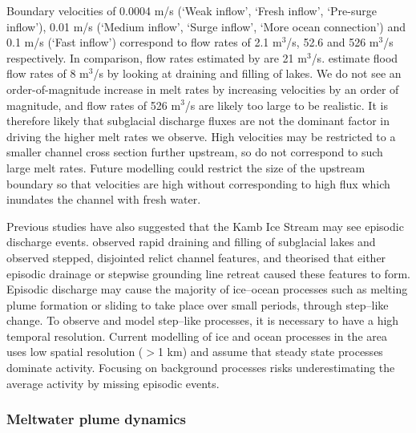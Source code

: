 Boundary velocities of 0.0004  $\mathrm{m}$/s (`Weak inflow', `Fresh inflow', `Pre-surge inflow'), 0.01  $\mathrm{m}$/s (`Medium inflow', `Surge inflow', `More ocean connection') and 0.1 $\mathrm{m}$/s (`Fast inflow') correspond to flow rates of 2.1 $\mathrm{m}^3$/s, 52.6 and 526 $\mathrm{m}^3$/s respectively. In comparison, flow rates estimated by \cite{le2009subglacial} are 21 $\mathrm{m}^3$/s. \cite{kim2016active} estimate flood flow rates of 8 $\mathrm{m}^3$/s by looking at draining and filling of lakes. We do not see an order-of-magnitude increase in melt rates by increasing velocities by an order of magnitude, and flow rates of 526 $\mathrm{m}^3$/s are likely too large to be realistic. It is therefore likely that subglacial discharge fluxes are not the dominant factor in driving the higher melt rates we observe. High velocities may be restricted to a smaller channel cross section further upstream, so do not correspond to such large melt rates. Future modelling could restrict the size of the upstream boundary so that velocities are high without corresponding to high flux which inundates the channel with fresh water.

Previous studies have also suggested that the Kamb Ice Stream may see episodic discharge events. \cite{kim2016active} observed rapid draining and filling of subglacial lakes and \cite{horgan2017poststagnation} observed stepped, disjointed relict channel features, and theorised that either episodic drainage or stepwise grounding line retreat caused these features to form.
Episodic discharge may cause the majority of ice--ocean processes such as melting plume formation or sliding to take place over small periods, through step--like change. To observe and model step--like processes, it is necessary to have a high temporal resolution. Current modelling of ice and ocean processes in the area \citep[e.g.][]{holland2003ice} uses low spatial resolution ($>$1 km) and assume that steady state processes dominate activity. Focusing on background processes risks underestimating the average activity by missing episodic events.

\subsubsection{Meltwater plume dynamics} 

